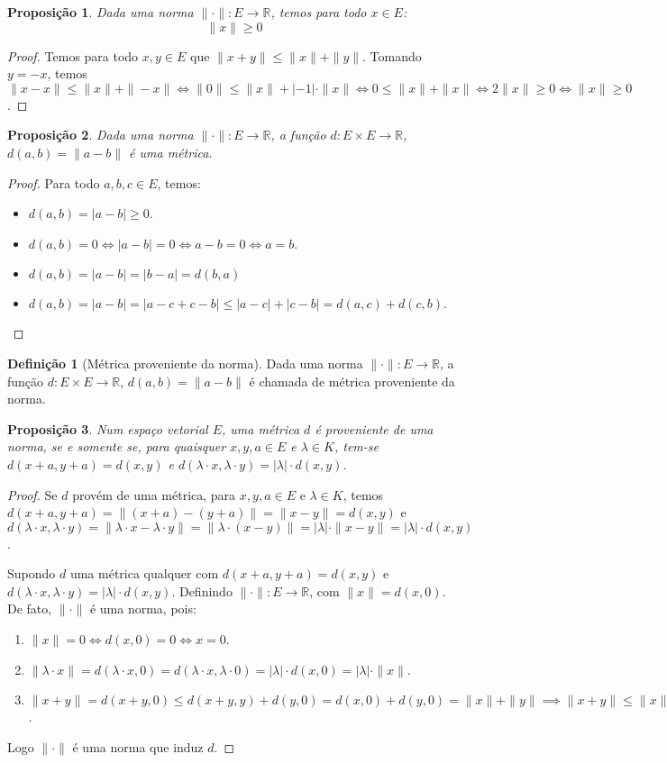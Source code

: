 \documentclass{article}
\theoremstyle{plain}
\newtheorem{prop}{Proposição}[section]
\theoremstyle{definition}
\newtheorem{definicao}{Definição}[section]
\theoremstyle{remark}
\begin{document}
\begin{prop}
	Dada uma norma $\| \cdot \|: E \to \mathbb{R}$, temos para todo $x\in E$:
	$$ \|x \| \geq 0 $$
\end{prop}
\begin{proof}
	Temos para todo $x,y \in E$ que $\| x+y\| \leq \|x \| + \| y \|$.  Tomando $y = - x$, temos $\| x-x\| \leq \| x\| + \| -x\| \iff \|0 \| \leq \|x\| + |-1| \cdot \| x\| \iff 0 \leq \|x\| + \|x\| \iff 2\|x\| \geq 0 \iff \|x\| \geq 0$.
\end{proof}
\begin{prop}
	Dada uma norma $\| \cdot \|: E \to \mathbb{R}$, a função $d: E\times E \to \mathbb{R}$, $d(a,b) = \| a-b\|$ é uma métrica.
\end{prop}
\begin{proof}
	Para todo $a,b,c\in E$, temos:
	\begin{itemize}
		\item $d(a,b) = |a-b| \geq 0 $.
		\item $d(a,b) = 0 \iff |a-b| = 0 \iff a-b = 0 \iff a = b.$
		\item $d(a,b) = |a-b| = |b-a| = d(b,a)$
		\item $d(a,b) =  |a-b|  = |a-c+c-b| \leq |a-c| + |c-b| = d(a,c) + d(c,b)$.
	\end{itemize}
\end{proof}
\begin{definicao}[Métrica proveniente da norma]
	Dada uma norma $\| \cdot \|: E \to \mathbb{R}$, a função $d: E\times E \to \mathbb{R}$, $d(a,b) = \| a-b\|$ é chamada de métrica proveniente da norma.
\end{definicao}
\begin{prop}
	Num espaço vetorial $E$, uma métrica $d$ é proveniente de uma norma, se e somente se,  para quaisquer $x,y,a\in E$ e $\lambda\in K$, tem-se $d(x+a, y+a) = d(x,y)$ e $d(\lambda \cdot x, \lambda \cdot y ) = |\lambda| \cdot d(x,y)$.
\end{prop}
\begin{proof}
	Se $d$ provém de uma métrica, para $x,y, a\in E$ e $\lambda \in K$, temos  $d(x+a,y+a) = \|(x+a) -(y+a) \| = \| x- y\| = d(x,y)$ e $d(\lambda \cdot x, \lambda \cdot y ) = \| \lambda\cdot x  - \lambda \cdot y \| = \| \lambda\cdot (x-y) \| = |\lambda|\cdot \| x-y\| = |\lambda | \cdot d(x,y)$.

	Supondo $d$ uma métrica qualquer com $d(x+a, y+a) = d(x,y)$ e $d(\lambda \cdot x, \lambda \cdot y ) = |\lambda| \cdot d(x,y)$. Definindo $\| \cdot \| : E \to \mathbb{R}$, com $\|x\| = d(x,0)$. De fato, $\| \cdot \| $ é uma norma, pois:
	\begin{enumerate}
		\item $\| x\| = 0 \iff d(x,0) = 0 \iff x =0$.
		\item $\| \lambda \cdot x \| = d(\lambda \cdot x, 0) = d(\lambda \cdot x, \lambda \cdot 0) = |\lambda |\cdot d(x,0) = |\lambda|\cdot \| x\|$.
		\item $\| x+y\| = d(x+y,0) \leq d(x+y, y) + d(y , 0) = d(x,0) + d(y,0) = \| x\| + \|y\| \implies \| x+y \| \leq \|x\| +   \|y\|$.
	\end{enumerate}
	Logo $\|\cdot \|$ é uma norma que induz $d$.
\end{proof}
\end{document}
